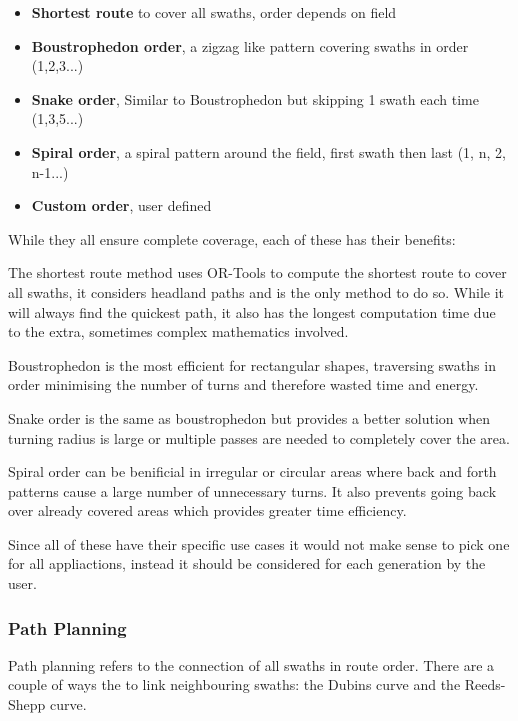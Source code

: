 \documentclass[final]{cmpreport_02}
\begin{document}
\begin{itemize}
	\item{\textbf{Shortest route} to cover all swaths, order depends on field}
	\item{\textbf{Boustrophedon order}, a zigzag like pattern covering swaths in order (1,2,3...)}
	\item{\textbf{Snake order}, Similar to Boustrophedon but skipping 1 swath each time (1,3,5...)}
	\item{\textbf{Spiral order}, a spiral pattern around the field, first swath then last (1, n, 2, n-1...)}
	\item{\textbf{Custom order}, user defined}
\end{itemize}
While they all ensure complete coverage, each of these has their benefits:

The shortest route method uses OR-Tools \citep{ortools} to compute the shortest route to cover all swaths, it considers headland paths and is the only method to do so.
While it will always find the quickest path, it also has the longest computation time due to the extra, sometimes complex mathematics involved.

Boustrophedon is the most efficient for rectangular shapes, traversing swaths in order minimising the number of turns and therefore wasted time and energy.

Snake order is the same as boustrophedon but provides a better solution when turning radius is large or multiple passes are needed to completely cover the area.


Spiral order can be benificial in irregular or circular areas where back and forth patterns cause a large number of unnecessary turns.
It also prevents going back over already covered areas which provides greater time efficiency.

Since all of these have their specific use cases it would not make sense to pick one for all appliactions, instead it should be considered for each generation by the user.

\subsubsection{Path Planning}
Path planning refers to the connection of all swaths in route order.
There are a couple of ways the to link neighbouring swaths: the Dubins curve and the Reeds-Shepp curve.

\end{document}
